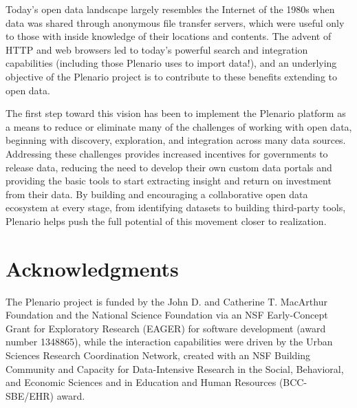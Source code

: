 \documentclass[11pt]{article}
\begin{document}
Today's open data landscape largely resembles the Internet of the 1980s when data was shared through anonymous file transfer servers, which were useful only to those with inside knowledge of their locations and contents. The advent of HTTP and web browsers led to today's powerful search and integration capabilities (including those Plenario uses to import data!), and an underlying objective of the Plenario project is to contribute to these benefits extending to open data.

The first step toward this vision has been to implement the Plenario platform as a means to reduce or eliminate many of the challenges of working with open data, beginning with discovery, exploration, and integration across many data sources. Addressing these challenges provides increased incentives for governments to release data, reducing the need to develop their own custom data portals and providing the basic tools to start extracting insight and return on investment from their data. By building and encouraging a collaborative open data ecosystem at every stage, from identifying datasets to building third-party tools, Plenario helps push the full potential of this movement closer to realization. 

\section*{Acknowledgments}
The Plenario project is funded by the John D. and Catherine T. MacArthur Foundation and the National Science Foundation via an NSF Early-Concept Grant for Exploratory Research (EAGER) for software development (award number 1348865), while the interaction capabilities were driven by the Urban Sciences Research Coordination Network, created with an NSF Building Community and Capacity for Data-Intensive Research in the Social, Behavioral, and Economic Sciences and in Education and Human Resources (BCC-SBE/EHR) award.
\end{document}
